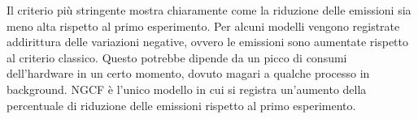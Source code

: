\begin{table}[H]
    \centering
    \caption{Confronto delle emissioni}
\end{table}

\noindent Il criterio più stringente mostra chiaramente come la riduzione delle emissioni sia meno alta rispetto al primo esperimento.
Per alcuni modelli vengono registrate addirittura delle variazioni negative, ovvero le emissioni sono aumentate rispetto al criterio classico. Questo potrebbe dipende da un picco di consumi dell'hardware in un certo momento, dovuto magari a qualche processo in background.
NGCF è l'unico modello in cui si registra un'aumento della percentuale di riduzione delle emissioni rispetto al primo esperimento.


